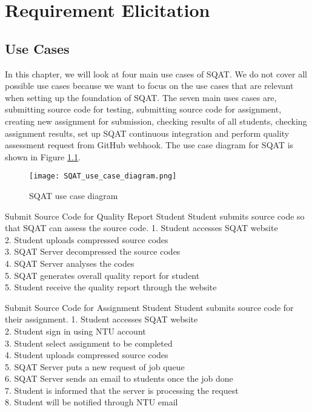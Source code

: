 \chapter{Requirement Elicitation}

\section{Use Cases}

In this chapter, we will look at four main use cases of SQAT. We do not cover all possible use cases because we want to focus on the use cases that are relevant when setting up the foundation of SQAT. The seven main uses cases are, submitting source code for testing, submitting source code for assignment, creating new assignment for submission, checking results of all students, checking assignment results, set up SQAT continuous integration and perform quality assessment request from GitHub webhook. The use case diagram for SQAT is shown in Figure \ref{figure:SQAT_use_case_diagram}. 

\begin{figure}[t]
    \centering
    \texttt{[image: SQAT\_use\_case\_diagram.png]}
    \caption{SQAT use case diagram}
    \label{figure:SQAT_use_case_diagram}
\end{figure}

\usecases
    {Submit Source Code for Quality Report}
    {Student}
    {Student submits source code so that SQAT can assess the source code. }
    {
        1. Student accesses SQAT website\\
        2. Student uploads compressed source codes\\
        3. SQAT Server decompressed the source codes\\
        4. SQAT Server analyses the codes\\
        5. SQAT generates overall quality report for student\\
        5. Student receive the quality report through the website
    }
    
\usecases
    {Submit Source Code for Assignment}
    {Student}
    {Student submits source code for their assignment. }
    {
        1. Student accesses SQAT website\\
        2. Student sign in using NTU account\\
        3. Student select assignment to be completed\\
        4. Student uploads compressed source codes\\
        5. SQAT Server puts a new request of job queue\\
        6. SQAT Server sends an email to students once the job done\\
        7. Student is informed that the server is processing the request\\
        8. Student will be notified through NTU email
    }
    
